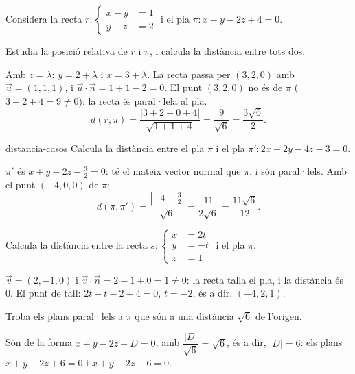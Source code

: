 Considera la recta $r\colon\left\{\begin{aligned}x-y&=1\\y-z&=2\end{aligned}\right.$ i el pla
$\pi\colon x+y-2z+4=0$.

\begin{apartats}

Estudia la posició relativa de $r$ i $\pi$, i calcula la distància entre tots dos.

\begin{solucio}
Amb $z=\lambda$: $y=2+\lambda$ i $x=3+\lambda$. La recta passa per $(3,2,0)$ amb $\vec u=(1,1,1)$, i
$\vec u\cdot\vec n=1+1-2=0$. El punt $(3,2,0)$ no és de $\pi$ ($3+2+4=9\ne0$): la recta és paral·lela
al pla.
\[
d(r,\pi)=\frac{|3+2-0+4|}{\sqrt{1+1+4}}=\frac9{\sqrt6}=\frac{3\sqrt6}2.
\]
\end{solucio}

\begin{tria}{distancia-casos}
Calcula la distància entre el pla $\pi$ i el pla $\pi'\colon 2x+2y-4z-3=0$.

\begin{solucio}
$\pi'$ és $x+y-2z-\frac32=0$: té el mateix vector normal que $\pi$, i són paral·lels. Amb el punt
$(-4,0,0)$ de $\pi$:
\[
d(\pi,\pi')=\frac{\left|-4-\frac32\right|}{\sqrt6}=\frac{11}{2\sqrt6}=\frac{11\sqrt6}{12}.
\]
\end{solucio}

Calcula la distància entre la recta
$s\colon\left\{\begin{aligned}x&=2t\\y&=-t\\z&=1\end{aligned}\right.$ i el pla $\pi$.

\begin{solucio}
$\vec v=(2,-1,0)$ i $\vec v\cdot\vec n=2-1+0=1\ne0$: la recta talla el pla, i la distància és 0.
El punt de tall: $2t-t-2+4=0$, $t=-2$, és a dir, $(-4,2,1)$.
\end{solucio}
\end{tria}

\begin{nomesllarg}
Troba els plans paral·lels a $\pi$ que són a una distància $\sqrt6$ de l'origen.

\begin{solucio}
Són de la forma $x+y-2z+D=0$, amb $\dfrac{|D|}{\sqrt6}=\sqrt6$, és a dir, $|D|=6$: els plans
$x+y-2z+6=0$ i $x+y-2z-6=0$.
\end{solucio}
\end{nomesllarg}

\end{apartats}
